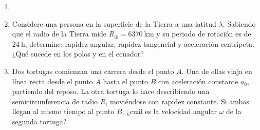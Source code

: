 \documentclass[letterpaper,11pt]{article}
\begin{document}
\vspace{-1cm}
\begin{enumerate}\setlength{\itemsep}{0.4cm}


\item[]

\item Considere una persona en la superficie de la Tierra a una latitud $\lambda$. Sabiendo que el radio de la Tierra mide $R_{\oplus}=\SI{6370}{\km}$ y su periodo de rotación es de $\SI{24}{\hour}$, determine: rapidez angular, rapidez tangencial y aceleración centrípeta. ¿Qué sucede en los polos y en el ecuador?

\item Dos tortugas comienzan una carrera desde el punto $A$. Una de ellas viaja en línea recta desde el punto $A$ hasta el punto $B$ con aceleración constante $a_0$, partiendo del reposo. La otra tortuga lo hace describiendo una semicircunferencia de radio $R$, moviéndose con rapidez constante. Si ambas llegan al mismo tiempo al punto $B$, ¿cuál es la velocidad angular $\omega$ de la segunda tortuga?
    
\begin{figure}[H]
    \centering
    \hspace{1em}
    \begin{subfigure}[t]{0.35\textwidth}
        \centering
        
    \end{subfigure}
\end{figure}

\end{enumerate}
\end{document}
